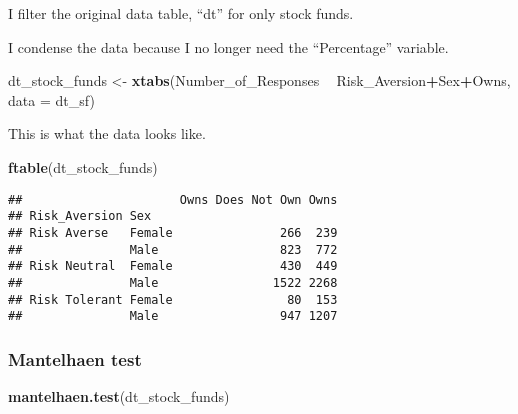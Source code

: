 \documentclass[
]{article}
\newenvironment{Shaded}{\begin{snugshade}}{\end{snugshade}}
\newcommand{\DataTypeTok}[1]{\textcolor[rgb]{0.13,0.29,0.53}{#1}}
\newcommand{\KeywordTok}[1]{\textcolor[rgb]{0.13,0.29,0.53}{\textbf{#1}}}
\newcommand{\NormalTok}[1]{#1}
\newcommand{\OperatorTok}[1]{\textcolor[rgb]{0.81,0.36,0.00}{\textbf{#1}}}
\newcommand{\StringTok}[1]{\textcolor[rgb]{0.31,0.60,0.02}{#1}}
\begin{document}
I filter the original data table, ``dt'' for only stock funds.

\begin{Shaded}
\end{Shaded}

I condense the data because I no longer need the ``Percentage''
variable.

\begin{Shaded}
\begin{Highlighting}[]
\NormalTok{dt_stock_funds <-}\StringTok{ }\KeywordTok{xtabs}\NormalTok{(Number_of_Responses }\OperatorTok{~}\StringTok{ }\NormalTok{Risk_Aversion}\OperatorTok{+}\NormalTok{Sex}\OperatorTok{+}\NormalTok{Owns, }\DataTypeTok{data =}\NormalTok{ dt_sf)}
\end{Highlighting}
\end{Shaded}

This is what the data looks like.

\begin{Shaded}
\begin{Highlighting}[]
\KeywordTok{ftable}\NormalTok{(dt_stock_funds)}
\end{Highlighting}
\end{Shaded}

\begin{verbatim}
##                      Owns Does Not Own Owns
## Risk_Aversion Sex                          
## Risk Averse   Female               266  239
##               Male                 823  772
## Risk Neutral  Female               430  449
##               Male                1522 2268
## Risk Tolerant Female                80  153
##               Male                 947 1207
\end{verbatim}

\hypertarget{mantelhaen-test-2}{%
\subsubsection{Mantelhaen test}\label{mantelhaen-test-2}}

\begin{Shaded}
\begin{Highlighting}[]
\KeywordTok{mantelhaen.test}\NormalTok{(dt_stock_funds)}
\end{Highlighting}
\end{Shaded}
\end{document}
